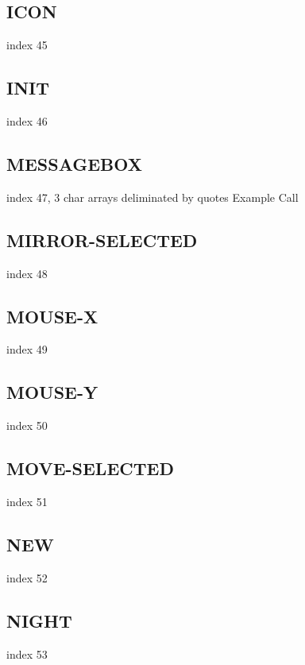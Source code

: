 \documentclass[a4paper]{report}
\begin{document}
\subsection{ICON}

index 45

\subsection{INIT}

index 46

\subsection{MESSAGEBOX}

index 47, 3 char arrays deliminated by quotes Example Call

\subsection{MIRROR-SELECTED}

index 48

\subsection{MOUSE-X}

index 49

\subsection{MOUSE-Y}

index 50

\subsection{MOVE-SELECTED}

index 51

\subsection{NEW}

index 52

\subsection{NIGHT}

index 53
\end{document}
